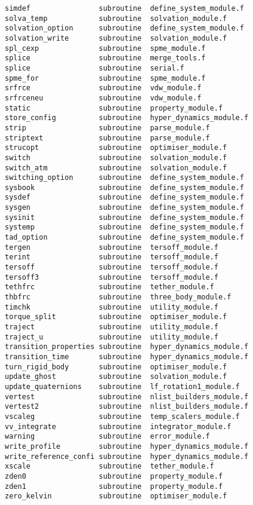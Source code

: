 \begin{verbatim}
simdef                subroutine  define_system_module.f    
solva_temp            subroutine  solvation_module.f        
solvation_option      subroutine  define_system_module.f    
solvation_write       subroutine  solvation_module.f        
spl_cexp              subroutine  spme_module.f             
splice                subroutine  merge_tools.f             
splice                subroutine  serial.f                  
spme_for              subroutine  spme_module.f             
srfrce                subroutine  vdw_module.f              
srfrceneu             subroutine  vdw_module.f              
static                subroutine  property_module.f         
store_config          subroutine  hyper_dynamics_module.f   
strip                 subroutine  parse_module.f            
striptext             subroutine  parse_module.f            
strucopt              subroutine  optimiser_module.f        
switch                subroutine  solvation_module.f        
switch_atm            subroutine  solvation_module.f        
switching_option      subroutine  define_system_module.f    
sysbook               subroutine  define_system_module.f    
sysdef                subroutine  define_system_module.f    
sysgen                subroutine  define_system_module.f    
sysinit               subroutine  define_system_module.f    
systemp               subroutine  define_system_module.f    
tad_option            subroutine  define_system_module.f    
tergen                subroutine  tersoff_module.f          
terint                subroutine  tersoff_module.f          
tersoff               subroutine  tersoff_module.f          
tersoff3              subroutine  tersoff_module.f          
tethfrc               subroutine  tether_module.f           
thbfrc                subroutine  three_body_module.f       
timchk                subroutine  utility_module.f          
torque_split          subroutine  optimiser_module.f        
traject               subroutine  utility_module.f          
traject_u             subroutine  utility_module.f          
transition_properties subroutine  hyper_dynamics_module.f   
transition_time       subroutine  hyper_dynamics_module.f   
turn_rigid_body       subroutine  optimiser_module.f        
update_ghost          subroutine  solvation_module.f        
update_quaternions    subroutine  lf_rotation1_module.f     
vertest               subroutine  nlist_builders_module.f   
vertest2              subroutine  nlist_builders_module.f   
vscaleg               subroutine  temp_scalers_module.f     
vv_integrate          subroutine  integrator_module.f       
warning               subroutine  error_module.f            
write_profile         subroutine  hyper_dynamics_module.f   
write_reference_confi subroutine  hyper_dynamics_module.f   
xscale                subroutine  tether_module.f           
zden0                 subroutine  property_module.f         
zden1                 subroutine  property_module.f         
zero_kelvin           subroutine  optimiser_module.f        
\end{verbatim}
